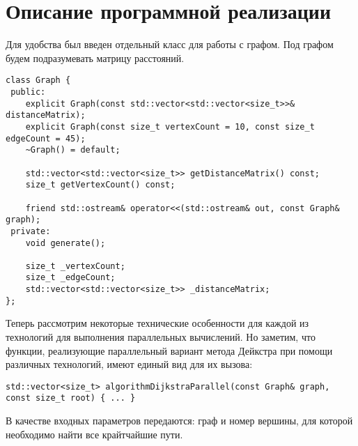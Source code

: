 \documentclass{report}
\begin{document}
\section*{Описание программной реализации}
Для удобства был введен отдельный класс для работы с графом. Под графом будем подразумевать матрицу расстояний.
\begin{lstlisting}
class Graph {
 public:
    explicit Graph(const std::vector<std::vector<size_t>>& distanceMatrix);
    explicit Graph(const size_t vertexCount = 10, const size_t edgeCount = 45);
    ~Graph() = default;

    std::vector<std::vector<size_t>> getDistanceMatrix() const;
    size_t getVertexCount() const;

    friend std::ostream& operator<<(std::ostream& out, const Graph& graph);
 private:
    void generate();

    size_t _vertexCount;
    size_t _edgeCount;
    std::vector<std::vector<size_t>> _distanceMatrix;
};
\end{lstlisting}
\par Теперь рассмотрим некоторые технические особенности для каждой из технологий для выполнения параллельных вычислений. Но  заметим, что функции, реализующие параллельный вариант метода Дейкстра при помощи различных технологий,  имеют единый вид для их вызова:
\begin{lstlisting}
std::vector<size_t> algorithmDijkstraParallel(const Graph& graph, const size_t root) { ... }
\end{lstlisting}
\par В качестве входных параметров передаются: граф и номер вершины, для которой необходимо найти все крайтчайшие пути.
\end{document}
